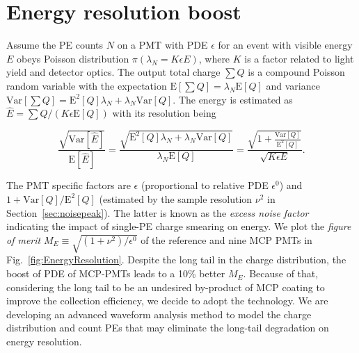 \section{Energy resolution boost}
\label{Result}
Assume the PE counts $N$ on a PMT with PDE $\epsilon$ for an event with visible energy $E$ obeys Poisson distribution $\pi(\lambda_N=K\epsilon E)$, where $K$ is a factor related to light yield and detector optics. The output total charge $\sum{Q}$ is a compound Poisson random variable with the expectation $\mathrm{E}[\sum{Q}]=\lambda_N\mathrm{E}[Q]$ and variance $\mathrm{Var}[\sum{Q}]=\mathrm{E}^2[Q]\lambda_N+\lambda_N\mathrm{Var}[Q]$. The energy is estimated as $\hat{E}=\sum{Q}/(K\epsilon\mathrm{E}[Q])$ with its resolution being

\begin{equation}
    \frac{\sqrt{\mathrm{Var}[\hat{E}]}}{\mathrm{E}[\hat{E}]}=\frac{\sqrt{\mathrm{E}^2[Q]\lambda_N+\lambda_N\mathrm{Var}[Q]}}{\lambda_N\mathrm{E}[Q]}=\frac{\sqrt{1+\frac{\mathrm{Var}[Q]}{\mathrm{E}^2[Q]}}}{\sqrt{K\epsilon E}}.
\end{equation}

The PMT specific factors are $\epsilon$ (proportional to relative PDE $\epsilon^0$) and \(1 + \mathrm{Var}[Q]/ \mathrm{E}^2[Q]\) (estimated by the sample resolution $\nu^2$ in Section~\ref{sec:noisepeak}).  The latter is known as the \emph{excess noise factor}~\cite{JUNOMassTesting,ENF,ENFAuger} indicating the impact of single-PE charge smearing on energy.  We plot the \emph{figure of merit} $M_{E}\equiv\sqrt{({1+\nu^2})/{\epsilon^0}}$ of the reference and nine MCP PMTs in Fig.~\ref{fig:EnergyResolution}. Despite the long tail in the charge distribution, the boost of PDE of MCP-PMTs leads to a 10\% better $M_{E}$.  Because of that, considering the long tail to be an undesired by-product of MCP coating to improve the collection efficiency, we decide to adopt the technology.  We are developing an advanced waveform analysis method to model the charge distribution and count PEs that may eliminate the long-tail degradation on energy resolution.

